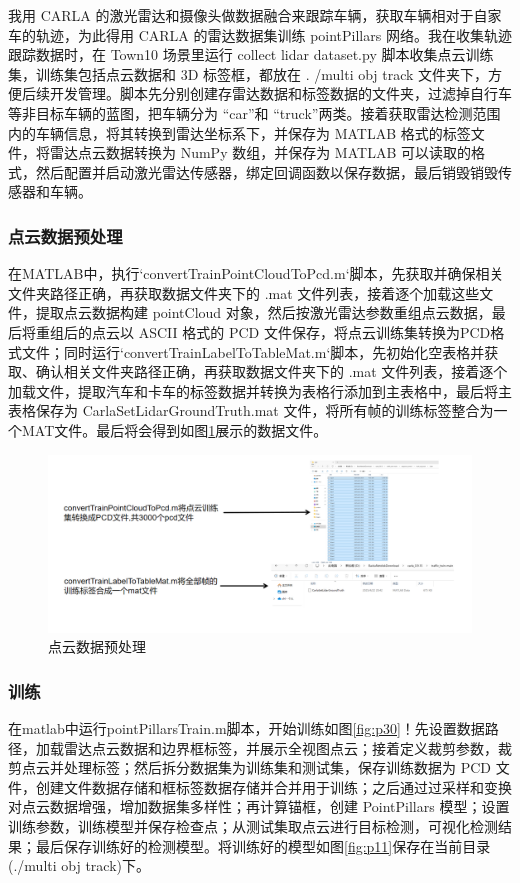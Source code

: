 我用 CARLA 的激光雷达和摄像头做数据融合来跟踪车辆，获取车辆相对于自家车的轨迹，为此得用 CARLA 的雷达数据集训练 pointPillars 网络。我在收集轨迹跟踪数据时，在 Town10 场景里运行 collect lidar dataset.py 脚本收集点云训练集，训练集包括点云数据和 3D 标签框，都放在 . /multi obj track 文件夹下，方便后续开发管理。脚本先分别创建存雷达数据和标签数据的文件夹，过滤掉自行车等非目标车辆的蓝图，把车辆分为 “car”和 “truck”两类。接着获取雷达检测范围内的车辆信息，将其转换到雷达坐标系下，并保存为 MATLAB 格式的标签文件，将雷达点云数据转换为 NumPy 数组，并保存为 MATLAB 可以读取的格式，然后配置并启动激光雷达传感器，绑定回调函数以保存数据，最后销毁销毁传感器和车辆。

\subsubsection{点云数据预处理}
在MATLAB中，执行`convertTrainPointCloudToPcd.m`脚本，先获取并确保相关文件夹路径正确，再获取数据文件夹下的 .mat 文件列表，接着逐个加载这些文件，提取点云数据构建 pointCloud 对象，然后按激光雷达参数重组点云数据，最后将重组后的点云以 ASCII 格式的 PCD 文件保存，将点云训练集转换为PCD格式文件；同时运行`convertTrainLabelToTableMat.m`脚本，先初始化空表格并获取、确认相关文件夹路径正确，再获取数据文件夹下的 .mat 文件列表，接着逐个加载文件，提取汽车和卡车的标签数据并转换为表格行添加到主表格中，最后将主表格保存为 CarlaSetLidarGroundTruth.mat 文件，将所有帧的训练标签整合为一个MAT文件。最后将会得到如图\ref{fig:p10}展示的数据文件。




\begin{figure}[htbp] %
	\centering
	\includegraphics[width=1\textwidth]{p10} %
	\caption{点云数据预处理} %
	\label{fig:p10} %
\end{figure}




\subsubsection{训练}
在matlab中运行pointPillarsTrain.m脚本，开始训练如图\ref{fig:p30}！先设置数据路径，加载雷达点云数据和边界框标签，并展示全视图点云；接着定义裁剪参数，裁剪点云并处理标签；然后拆分数据集为训练集和测试集，保存训练数据为 PCD 文件，创建文件数据存储和框标签数据存储并合并用于训练；之后通过过采样和变换对点云数据增强，增加数据集多样性；再计算锚框，创建 PointPillars 模型；设置训练参数，训练模型并保存检查点；从测试集取点云进行目标检测，可视化检测结果；最后保存训练好的检测模型。将训练好的模型如图\ref{fig:p11}保存在当前目录(./multi obj track)下。



